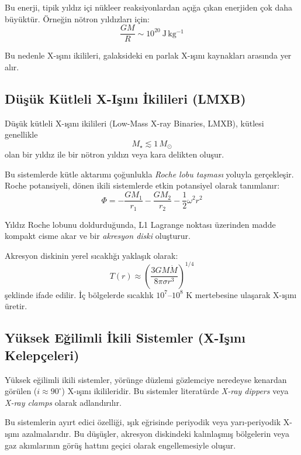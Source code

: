 Bu enerji, tipik yıldız içi nükleer reaksiyonlardan açığa çıkan enerjiden çok daha büyüktür. Örneğin nötron yıldızları için:
\begin{equation}
\frac{GM}{R} \sim 10^{20}\ \mathrm{J\,kg^{-1}}
\end{equation}

Bu nedenle X-ışını ikilileri, galaksideki en parlak X-ışını kaynakları arasında yer alır.

\subsection{Düşük Kütleli X-Işını İkilileri (LMXB)}

Düşük kütleli X-ışını ikilileri (Low-Mass X-ray Binaries, LMXB), kütlesi genellikle
\begin{equation}
M_\star \lesssim 1\,M_\odot
\end{equation}
olan bir yıldız ile bir nötron yıldızı veya kara delikten oluşur.

Bu sistemlerde kütle aktarımı çoğunlukla \emph{Roche lobu taşması} yoluyla gerçekleşir. Roche potansiyeli, dönen ikili sistemlerde etkin potansiyel olarak tanımlanır:
\begin{equation}
\Phi = -\frac{GM_1}{r_1} - \frac{GM_2}{r_2} - \frac{1}{2}\omega^2 r^2
\end{equation}

Yıldız Roche lobunu doldurduğunda, L1 Lagrange noktası üzerinden madde kompakt cisme akar ve bir \emph{akresyon diski} oluşturur.

Akresyon diskinin yerel sıcaklığı yaklaşık olarak:
\begin{equation}
T(r) \approx \left( \frac{3GM\dot{M}}{8\pi \sigma r^3} \right)^{1/4}
\end{equation}
şeklinde ifade edilir. İç bölgelerde sıcaklık $10^7$--$10^8$ K mertebesine ulaşarak X-ışını üretir.

\subsection{Yüksek Eğilimli İkili Sistemler (X-Işını Kelepçeleri)}

Yüksek eğilimli ikili sistemler, yörünge düzlemi gözlemciye neredeyse kenardan görülen ($i \approx 90^\circ$) X-ışını ikilileridir. Bu sistemler literatürde \emph{X-ray dippers} veya \emph{X-ray clamps} olarak adlandırılır.

Bu sistemlerin ayırt edici özelliği, ışık eğrisinde periyodik veya yarı-periyodik X-ışını azalmalarıdır. Bu düşüşler, akresyon diskindeki kalınlaşmış bölgelerin veya gaz akımlarının görüş hattını geçici olarak engellemesiyle oluşur.

